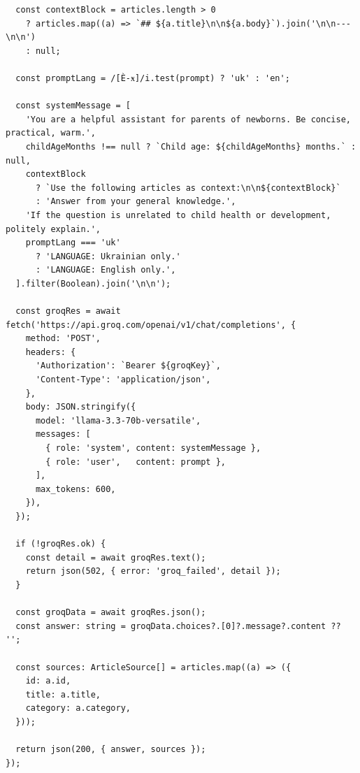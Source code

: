 \documentclass[%
  ukrainian, utf8, columnvii, simple,
  hpadding=10mm, vpadding=10mm, reduceheight=2mm,
  floatsection,
]{eskdtext}
\begin{document}
{\begin{verbatim}
  const contextBlock = articles.length > 0
    ? articles.map((a) => `## ${a.title}\n\n${a.body}`).join('\n\n---\n\n')
    : null;

  const promptLang = /[Ѐ-ӿ]/i.test(prompt) ? 'uk' : 'en';

  const systemMessage = [
    'You are a helpful assistant for parents of newborns. Be concise, practical, warm.',
    childAgeMonths !== null ? `Child age: ${childAgeMonths} months.` : null,
    contextBlock
      ? `Use the following articles as context:\n\n${contextBlock}`
      : 'Answer from your general knowledge.',
    'If the question is unrelated to child health or development, politely explain.',
    promptLang === 'uk'
      ? 'LANGUAGE: Ukrainian only.'
      : 'LANGUAGE: English only.',
  ].filter(Boolean).join('\n\n');

  const groqRes = await fetch('https://api.groq.com/openai/v1/chat/completions', {
    method: 'POST',
    headers: {
      'Authorization': `Bearer ${groqKey}`,
      'Content-Type': 'application/json',
    },
    body: JSON.stringify({
      model: 'llama-3.3-70b-versatile',
      messages: [
        { role: 'system', content: systemMessage },
        { role: 'user',   content: prompt },
      ],
      max_tokens: 600,
    }),
  });

  if (!groqRes.ok) {
    const detail = await groqRes.text();
    return json(502, { error: 'groq_failed', detail });
  }

  const groqData = await groqRes.json();
  const answer: string = groqData.choices?.[0]?.message?.content ?? '';

  const sources: ArticleSource[] = articles.map((a) => ({
    id: a.id,
    title: a.title,
    category: a.category,
  }));

  return json(200, { answer, sources });
});
\end{verbatim}

}
\end{document}
